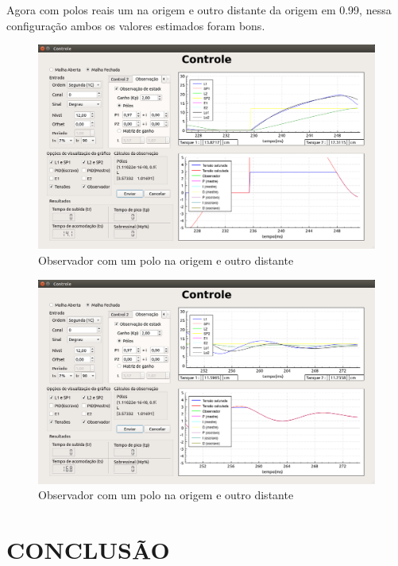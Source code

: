\documentclass[a4paper,12pt]{article}
\begin{document}
\newpage
\hspace{4ex} Agora com polos reais um na origem e outro distante da origem em 0.99, nessa configuração ambos os valores estimados foram bons.
\begin{figure}[!h]
\centering
\includegraphics[width=14cm]{FotosObservador/PoloRapidoELento2}
\caption{Observador com um polo na origem e outro distante}
\label{img7}
\end{figure}
\begin{figure}[!h]
\centering
\includegraphics[width=14cm]{FotosObservador/PoloRapidoELento1}
\caption{Observador com um polo na origem e outro distante}
\label{img8}
\end{figure}

\newpage


\thispagestyle{main}

\section{CONCLUSÃO}
\end{document}
